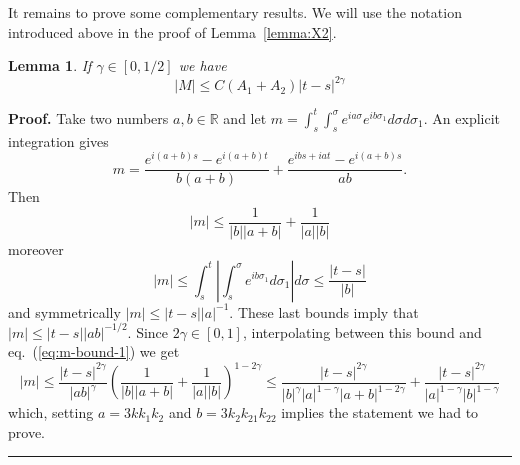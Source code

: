 \documentclass[a4paper,11pt,reqno]{article}
\newcommand{\RR}{\mathbb{R}}
\newtheorem{lemma}[theorem]{Lemma}
\newenvironment{proof}[1][Proof]{\textbf{#1.} }{\ \rule{0.5em}{0.5em}}
\begin{document}
\bigskip
It remains to prove some complementary results. We will use the
notation introduced above in the proof of Lemma~\ref{lemma:X2}.

\begin{lemma}
\label{lemma:M-bounds}
If $\gamma \in[0,1/2]$ we have
$$
|M| \le C (A_1+A_2)  |t-s|^{2\gamma} 
$$  
\end{lemma}
\begin{proof}
  Take two numbers $a,b \in \RR$ and let 
$
m = \int_s^t \int_s^\sigma e^{i a \sigma} e^{i b \sigma_1} d\sigma d\sigma_1 
$.
An explicit integration gives
$$
m = \frac{e^{i(a+b)s}-e^{i(a+b)t}}{b (a+b)} 
+\frac{e^{i bs+iat}-e^{i(a+b)s}}{ab}.
$$
Then
\begin{equation}
  \label{eq:m-bound-1}
|m| \le \frac{1}{|b||a+b|}+\frac{1}{|a||b|}
\end{equation}
moreover
\begin{equation*}
|m| \le  \int_s^t \left|\int_s^\sigma  e^{i b \sigma_1}
  d\sigma_1\right| d\sigma \le \frac{|t-s|}{|b|}  
\end{equation*}
and symmetrically $|m| \le |t-s| |a|^{-1}$. These last bounds imply
that  $|m| \le |t-s||ab|^{-1/2}$. Since $2\gamma \in [0,1]$,  interpolating between this bound and
eq.~(\ref{eq:m-bound-1}) we get
\begin{equation}
  \label{eq:m-bound-3}
 |m| \le \frac{|t-s|^{2\gamma}}{|ab|^{\gamma}}
 \left(\frac{1}{|b||a+b|}+\frac{1}{|a||b|}\right)^{1-2\gamma} \le 
\frac{|t-s|^{2\gamma}}{|b|^{\gamma}|a|^{1-\gamma}|a+b|^{1-2\gamma}}+\frac{|t-s|^{2\gamma}}{|a|^{1-\gamma}|b|^{1-\gamma}}
\end{equation}
which, setting $a = 3k k_1 k_2$ and $b = 3 k_2 k_{21} k_{22}$ implies
the statement we had to prove.
\end{proof}
\end{document}
